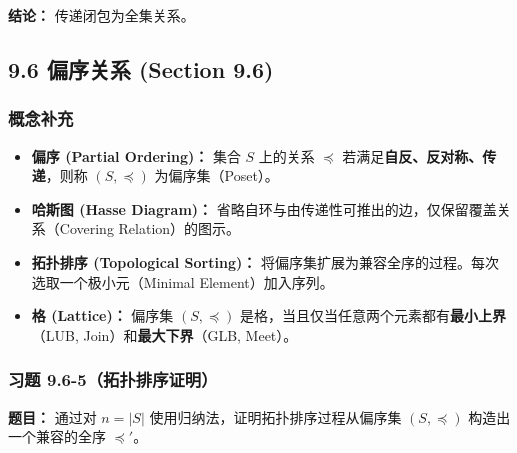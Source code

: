 \documentclass[11pt,UTF8]{article}
\begin{document}
\textbf{结论：} 传递闭包为全集关系。

\subsection{9.6 偏序关系 (Section 9.6)}

\subsubsection*{概念补充}
\begin{itemize}
    \item \textbf{偏序 (Partial Ordering)：} 集合 $S$ 上的关系 $\preceq$ 若满足\textbf{自反、反对称、传递}，则称 $(S, \preceq)$ 为偏序集（Poset）。
    \item \textbf{哈斯图 (Hasse Diagram)：} 省略自环与由传递性可推出的边，仅保留覆盖关系（Covering Relation）的图示。
    \item \textbf{拓扑排序 (Topological Sorting)：} 将偏序集扩展为兼容全序的过程。每次选取一个极小元（Minimal Element）加入序列。
    \item \textbf{格 (Lattice)：} 偏序集 $(S, \preceq)$ 是格，当且仅当任意两个元素都有\textbf{最小上界}（LUB, Join）和\textbf{最大下界}（GLB, Meet）。
\end{itemize}

\subsubsection*{习题 9.6-5（拓扑排序证明）}
\textbf{题目：} 通过对 $n=|S|$ 使用归纳法，证明拓扑排序过程从偏序集 $(S, \preceq)$ 构造出一个兼容的全序 $\preceq'$。
\end{document}
